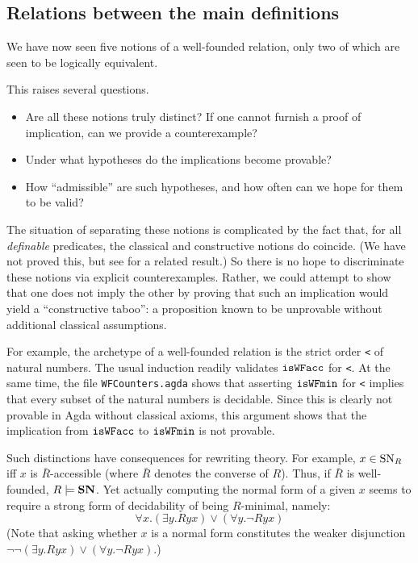 \subsection{Relations between the main definitions}

We have now seen five notions of a well-founded relation, only two of which
are seen to be logically equivalent.

This raises several questions.
\begin{itemize}
\item Are all these notions truly distinct?  If one cannot furnish a proof of implication,
can we provide a counterexample?
\item Under what hypotheses do the implications become provable?
\item How ``admissible'' are such hypotheses, and how often can we hope for them to be valid?
\end{itemize}

The situation of separating these notions is complicated by the fact that, for all
\emph{definable} predicates, the classical and constructive notions do coincide.
(We have not proved this, but see \cite{Berardi} for a related result.)
So there is no hope to discriminate these notions via explicit counterexamples.
Rather, we could attempt to show that one does not imply the other by proving that
such an implication would yield a ``constructive taboo'': a proposition known to be
unprovable without additional classical assumptions.

For example, the archetype of a well-founded relation is the strict order \verb|<|
of natural numbers.  The usual induction readily validates $\mathtt{isWFacc}$ for \verb|<|.
  At the same time, the file \texttt{WFCounters.agda} shows that
asserting $\mathtt{isWFmin}$ for \verb|<| implies that every subset of the natural numbers is decidable.  Since this is clearly not provable in Agda without classical axioms,
this argument shows that the implication from $\mathtt{isWFacc}$ to $\mathtt{isWFmin}$ is not provable.

Such distinctions have consequences for rewriting theory.
For example, $x\in \mathrm{SN}_R$ iff $x$ is $\bar{R}$-accessible (where $\bar{R}$ denotes
the converse of $R$).  Thus, if $\bar{R}$ is well-founded, $R \models \mathbf{SN}$.
Yet actually computing the normal form of a given $x$ seems to require a
strong form of decidability of being $R$-minimal, namely:
\[
\tag{$\isMinDec$} \forall x. \left(\exists y. Ryx\right) \lor \left(\forall y. \lnot Ryx\right)
\]
(Note that asking whether $x$ is a normal form constitutes the weaker disjunction
$\lnot\lnot\left(\exists y. Ryx\right) \lor \left(\forall y. \lnot Ryx\right)$.)

